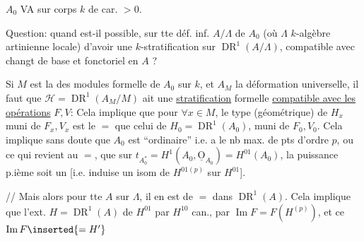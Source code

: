 $A_0$ VA sur corps $k$ de car. $>0$.

Question: quand est-il possible, sur tte déf. inf. $A/\Lambda$ de $A_0$ (où $\Lambda$ $k$-algèbre artinienne locale) d'avoir une $k$-stratification sur $\operatorname{DR}^1(A/\Lambda)$, compatible avec changt de base et fonctoriel en $A$ ?

Si $M$ est la  des modules formelle de $A_0$ sur $k$,  et $A_M$ la déformation universelle, il faut que $\mathcal H=\operatorname{DR}^1(A_M/M)$ ait une \uline{stratification} formelle \uline{compatible avec les opérations} $F,V$:
Cela implique que pour $\forall x\in M$, le type (géométrique) de $H_x$ muni de $F_x,V_x$ est le $=$ que celui de $H_0=\operatorname{DR}^1(A_0)$, muni de $F_0,V_0$. Cela implique sans doute que $A_0$ est ``ordinaire'' i.e. a le nb max. de pts d'ordre $p$, ou ce qui revient au $=$, que sur $t_{A_0^*}=H^1(A_0,\underline{\mathrm O}_{A_0})=H^{01}(A_0)$, la puissance p.ième soit un  [i.e. induise un isom de $H^{01(p)}$ sur $H^{01}$].


// Mais alors  pour tte $A$ sur $\Lambda$, il en est de $=$ dans $\operatorname{DR}^1(A)$. Cela implique que l'ext. $H=\operatorname{DR}^1(A)$ de $H^{01}$ par $H^{10}$  can., par $\operatorname{Im}F=F(H^{(p)})$, et ce $\operatorname{Im}F\inserted{=H'}$ 

